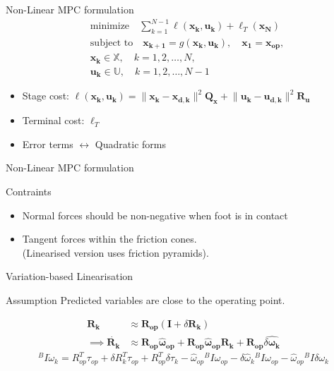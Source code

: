 \documentclass{beamer}
\begin{document}
\begin{frame}{Non-Linear MPC formulation}
\begin{equation*}
\begin{aligned}
    & \text{minimize} \quad \sum_{k=1}^{N-1} \ell(\mathbf{x_k}, \mathbf{u_k}) + \ell_T(\mathbf{x_N}) \\
    & \text{subject to} \quad \mathbf{x_{k+1}} = g(\mathbf{x_k}, \mathbf{u_k}), \quad \mathbf{x_1} = \mathbf{x_\text{op}}, \\
    & \mathbf{x_k} \in \mathbb{X}, \quad k = 1, 2, \dots, N, \\
    & \mathbf{u_k} \in \mathbb{U}, \quad k = 1, 2, \dots, N-1
\end{aligned}
\end{equation*}
\begin{itemize}
    \item Stage cost: $ \ell(\mathbf{x_k}, \mathbf{u_k}) = \lVert \mathbf{x_k} - \mathbf{x_{d, k}} \rVert ^ 2 \mathbf{Q_x} + \lVert \mathbf{u_k} - \mathbf{u_{d, k}} \rVert ^ 2 \mathbf{R_u}$
    \item Terminal cost: $ \ell_T $
    \item Error terms $\leftrightarrow$ Quadratic forms
\end{itemize}
\end{frame}

\begin{frame}{Non-Linear MPC formulation}
\begin{block}{Contraints}
\begin{itemize}
    \item Normal forces should be non-negative when foot is in contact
    \item Tangent forces within the friction cones.\\
        (Linearised version uses friction pyramids).
\end{itemize}
\end{block}
\end{frame}

\begin{frame}{Variation-based Linearisation}
\begin{block}{Assumption}
    Predicted variables are close to the operating point.
\end{block}
\begin{align}
\mathbf{R_k} & \approx \mathbf{R_{op}} (\mathbf{I} + \delta \mathbf{R_k})
\\ \implies
\dot{\mathbf{R_k}} & \approx \mathbf{R_{op}}\mathbf{\hat \omega_{op}} + \mathbf{R_{op}}\mathbf{\hat\omega_{op}}\mathbf{R_k} + \mathbf{R_{op}}\widehat{\delta\mathbf{\omega_k}}
\end{align}
\begin{equation}
    ^B I \dot{\omega}_k = R_{op}^T \tau_{op} + \delta R_k^T \tau_{op} + R_{op}^T \delta \tau_k - \hat{\omega}_{op} {}^B I \omega_{op} - \delta \hat{\omega}_k {}^B I \omega_{op} - \hat{\omega}_{op} {}^B I \delta \omega_k
\end{equation}
\end{frame}
\end{document}
